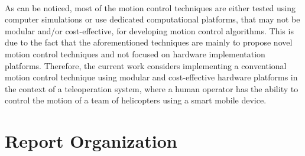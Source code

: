 \\
As can be noticed, most of the motion control techniques are either tested using computer simulations or use dedicated computational platforms, that may not be modular and/or cost-effective, for developing motion control algorithms. This is due to the fact that the aforementioned techniques are mainly to propose novel motion control techniques and not focused on hardware implementation platforms. Therefore, the current work considers implementing a conventional motion control technique using modular and cost-effective hardware platforms in the context of a teleoperation system, where a human operator has the ability to control the motion of a team of helicopters using a smart mobile device.


\section{Report Organization}

